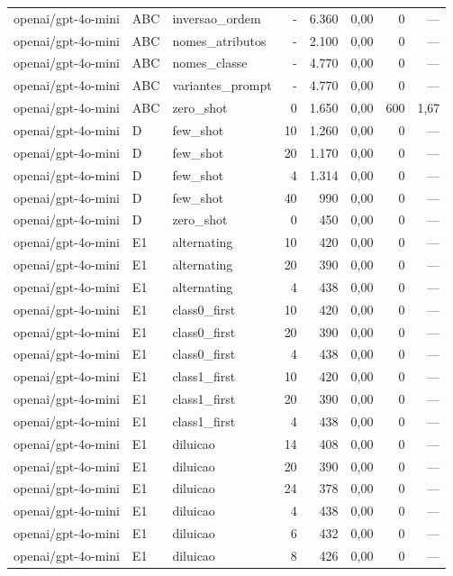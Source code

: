 \begin{table}[htbp]
\begin{tabular}{lllrrrrr}
openai/gpt-4o-mini & ABC & inversao\_ordem & - & 6.360 & 0,00 & 0 & — \\
openai/gpt-4o-mini & ABC & nomes\_atributos & - & 2.100 & 0,00 & 0 & — \\
openai/gpt-4o-mini & ABC & nomes\_classe & - & 4.770 & 0,00 & 0 & — \\
openai/gpt-4o-mini & ABC & variantes\_prompt & - & 4.770 & 0,00 & 0 & — \\
openai/gpt-4o-mini & ABC & zero\_shot & 0 & 1.650 & 0,00 & 600 & 1,67 \\
openai/gpt-4o-mini & D & few\_shot & 10 & 1.260 & 0,00 & 0 & — \\
openai/gpt-4o-mini & D & few\_shot & 20 & 1.170 & 0,00 & 0 & — \\
openai/gpt-4o-mini & D & few\_shot & 4 & 1.314 & 0,00 & 0 & — \\
openai/gpt-4o-mini & D & few\_shot & 40 & 990 & 0,00 & 0 & — \\
openai/gpt-4o-mini & D & zero\_shot & 0 & 450 & 0,00 & 0 & — \\
openai/gpt-4o-mini & E1 & alternating & 10 & 420 & 0,00 & 0 & — \\
openai/gpt-4o-mini & E1 & alternating & 20 & 390 & 0,00 & 0 & — \\
openai/gpt-4o-mini & E1 & alternating & 4 & 438 & 0,00 & 0 & — \\
openai/gpt-4o-mini & E1 & class0\_first & 10 & 420 & 0,00 & 0 & — \\
openai/gpt-4o-mini & E1 & class0\_first & 20 & 390 & 0,00 & 0 & — \\
openai/gpt-4o-mini & E1 & class0\_first & 4 & 438 & 0,00 & 0 & — \\
openai/gpt-4o-mini & E1 & class1\_first & 10 & 420 & 0,00 & 0 & — \\
openai/gpt-4o-mini & E1 & class1\_first & 20 & 390 & 0,00 & 0 & — \\
openai/gpt-4o-mini & E1 & class1\_first & 4 & 438 & 0,00 & 0 & — \\
openai/gpt-4o-mini & E1 & diluicao & 14 & 408 & 0,00 & 0 & — \\
openai/gpt-4o-mini & E1 & diluicao & 20 & 390 & 0,00 & 0 & — \\
openai/gpt-4o-mini & E1 & diluicao & 24 & 378 & 0,00 & 0 & — \\
openai/gpt-4o-mini & E1 & diluicao & 4 & 438 & 0,00 & 0 & — \\
openai/gpt-4o-mini & E1 & diluicao & 6 & 432 & 0,00 & 0 & — \\
openai/gpt-4o-mini & E1 & diluicao & 8 & 426 & 0,00 & 0 & — \\

\end{tabular}
\end{table}
